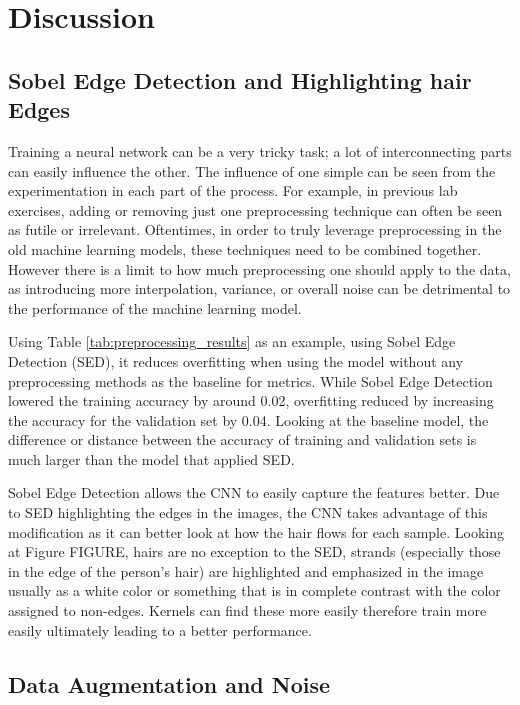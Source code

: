 \section{Discussion}

\subsection{Sobel Edge Detection and Highlighting hair Edges}

Training a neural network can be a very tricky task; a lot of interconnecting parts can easily influence the other. The influence of one simple can be seen from the experimentation in each part of the process. For example, in previous lab exercises, adding or removing just one preprocessing technique can often be seen as futile or irrelevant. Oftentimes, in order to truly leverage preprocessing in the old machine learning models, these techniques need to be combined together. However there is a limit to how much preprocessing one should apply to the data, as introducing more interpolation, variance, or overall noise can be detrimental to the performance of the machine learning model.

Using Table \ref{tab:preprocessing_results} as an example, using Sobel Edge Detection (SED), it reduces overfitting when using the model without any preprocessing methods as the baseline for metrics. While Sobel Edge Detection lowered the training accuracy by around 0.02, overfitting reduced by increasing the accuracy for the validation set by 0.04. Looking at the baseline model, the difference or distance between the accuracy of training and validation sets is much larger than the model that applied SED. 


Sobel Edge Detection allows the CNN to easily capture the features better. Due to SED highlighting the edges in the images, the CNN takes advantage of this modification as it can better look at how the hair flows for each sample. Looking at Figure FIGURE, hairs are no exception to the SED, strands (especially those in the edge of the person's hair) are highlighted and emphasized in the image usually as a white color or something that is in complete contrast with the color assigned to non-edges. Kernels can find these more easily therefore train more easily ultimately leading to a better performance.

\subsection{Data Augmentation and Noise}



